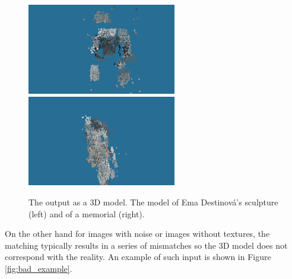 \begin{figure}[H]
\centerline{
\includegraphics[width=6.5cm]{img/ema_3Dresult.png}
\includegraphics[width=6.5cm]{img/memorial_3Dresult.png}}
\caption{The output as a 3D model. The model of Ema Destinová's sculpture (left) and of a memorial (right).}
\label{fig:outupt_samples}
\end{figure}

On the other hand for images with noise or images without textures, the matching typically results in a series of mismatches so the 3D model does not correspond with the reality.
An example of such input is shown in Figure \ref{fig:bad_example}.


